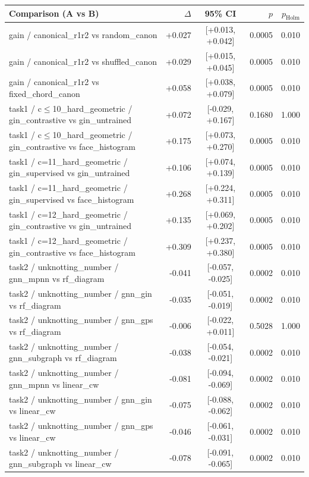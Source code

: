 \begin{longtable}{p{8.2cm} r c r r}
\toprule
Comparison (A vs B) & $\Delta$ & 95\% CI & $p$ & $p_\text{Holm}$\\
\midrule
\endhead
gain / canonical\_r1r2 vs random\_canon & +0.027 & [+0.013, +0.042] & 0.0005 & 0.010\\
gain / canonical\_r1r2 vs shuffled\_canon & +0.029 & [+0.015, +0.045] & 0.0005 & 0.010\\
gain / canonical\_r1r2 vs fixed\_chord\_canon & +0.058 & [+0.038, +0.079] & 0.0005 & 0.010\\
task1 / c$\le$10\_hard\_geometric / gin\_contrastive vs gin\_untrained & +0.072 & [-0.029, +0.167] & 0.1680 & 1.000\\
task1 / c$\le$10\_hard\_geometric / gin\_contrastive vs face\_histogram & +0.175 & [+0.073, +0.270] & 0.0005 & 0.010\\
task1 / c=11\_hard\_geometric / gin\_supervised vs gin\_untrained & +0.106 & [+0.074, +0.139] & 0.0005 & 0.010\\
task1 / c=11\_hard\_geometric / gin\_supervised vs face\_histogram & +0.268 & [+0.224, +0.311] & 0.0005 & 0.010\\
task1 / c=12\_hard\_geometric / gin\_contrastive vs gin\_untrained & +0.135 & [+0.069, +0.202] & 0.0005 & 0.010\\
task1 / c=12\_hard\_geometric / gin\_contrastive vs face\_histogram & +0.309 & [+0.237, +0.380] & 0.0005 & 0.010\\
task2 / unknotting\_number / gnn\_mpnn vs rf\_diagram & -0.041 & [-0.057, -0.025] & 0.0002 & 0.010\\
task2 / unknotting\_number / gnn\_gin vs rf\_diagram & -0.035 & [-0.051, -0.019] & 0.0002 & 0.010\\
task2 / unknotting\_number / gnn\_gps vs rf\_diagram & -0.006 & [-0.022, +0.011] & 0.5028 & 1.000\\
task2 / unknotting\_number / gnn\_subgraph vs rf\_diagram & -0.038 & [-0.054, -0.021] & 0.0002 & 0.010\\
task2 / unknotting\_number / gnn\_mpnn vs linear\_cw & -0.081 & [-0.094, -0.069] & 0.0002 & 0.010\\
task2 / unknotting\_number / gnn\_gin vs linear\_cw & -0.075 & [-0.088, -0.062] & 0.0002 & 0.010\\
task2 / unknotting\_number / gnn\_gps vs linear\_cw & -0.046 & [-0.061, -0.031] & 0.0002 & 0.010\\
task2 / unknotting\_number / gnn\_subgraph vs linear\_cw & -0.078 & [-0.091, -0.065] & 0.0002 & 0.010\\

\end{longtable}
